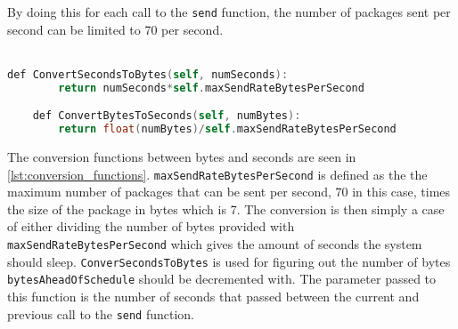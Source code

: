 By doing this for each call to the \texttt{send} function, the number of packages sent per second can be limited to 70 per second.
\\\\
\begin{lstlisting}[caption={function for converting seconds to bytes and bytes to seconds}, captionpos=b,language=C,label={lst:conversion_functions}]
    def ConvertSecondsToBytes(self, numSeconds):
        return numSeconds*self.maxSendRateBytesPerSecond

    def ConvertBytesToSeconds(self, numBytes):
        return float(numBytes)/self.maxSendRateBytesPerSecond
\end{lstlisting}
\noindent
The conversion functions between bytes and seconds are seen in \autoref{lst:conversion_functions}.
\texttt{maxSendRateBytesPerSecond} is defined as the the maximum number of packages that can be sent per second, 70 in this case, times the size of the package in bytes which is 7.
The conversion is then simply a case of either dividing the number of bytes provided with \texttt{maxSendRateBytesPerSecond} which gives the amount of seconds the system should sleep.
\texttt{ConverSecondsToBytes} is used for figuring out the number of bytes \texttt{bytesAheadOfSchedule} should be decremented with.
The parameter passed to this function is the number of seconds that passed between the current and previous call to the \texttt{send} function.
